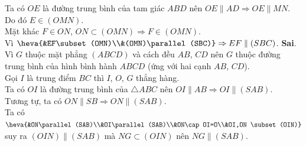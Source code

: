 \begin{ex}
{\begin{itemchoice}
			Ta có $OE$ là  đường trung bình của tam giác $ABD$ nên $OE\parallel AD \Rightarrow OE\parallel MN$. Do đó $E\in(OMN)$.\\
			Mặt khác $F\in ON$, $ON\subset(OMN) \Rightarrow F\in(OMN)$.\\ 
			Vì $\heva{&EF\subset(OMN)\\&(OMN)\parallel(SBC)} \Rightarrow  EF\parallel(SBC)$.
			\itemch \textbf{Sai}.\\ 
			Vì  $G$ thuộc mặt phẳng $(ABCD)$ và cách đều $AB$, $CD$ nên $G$ thuộc đường trung bình của hình bình hành $ABCD$ (ứng với hai cạnh $AB$, $CD$).\\
			Gọi  $I$ là trung điểm $BC$ thì $I$, $O$, $G$ thẳng hàng.\\
			Ta có $OI$  là đường trung bình của $\triangle ABC$ nên $OI\parallel AB \Rightarrow OI\parallel(SAB)$.\\
			Tương tự, ta  có $ON\parallel SB \Rightarrow ON\parallel(SAB)$.\\
			Ta có $\heva{&ON\parallel(SAB)\\&OI\parallel(SAB)\\&ON\cap OI=O\\&OI,ON \subset (OIN)}$ suy ra $(OIN)\parallel(SAB)$ mà $NG\subset(OIN)$ nên $NG\parallel(SAB)$. 
		\end{itemchoice}
	 }
\end{ex}

